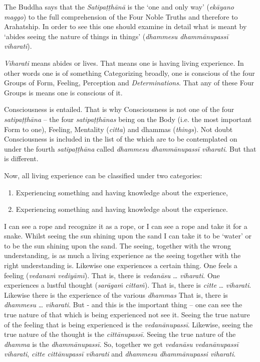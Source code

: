 The Buddha says that the \emph{Satipaṭṭhānā} is the `one and only way' (\emph{ekāyano maggo}) to the full comprehension of the Four Noble Truths and therefore to Arahatship. In order to see this one should examine in detail what is meant by `abides seeing the nature of things in things' (\emph{dhammesu dhammānupassī viharati}).

\emph{Viharati} means abides or lives. That means one is having living experience. In other words one is  of something Categorizing broadly, one is conscious of the four Groups of Form, Feeling, Perception and \emph{Determinations}. That any of these Four Groups is  means one is conscious of it.

Consciousness is  entailed. That is why Consciousness is not one of the four \emph{satipaṭṭhāna} -- the four \emph{satipaṭṭhānas} being on the Body (i.e. the most important Form to one), Feeling, Mentality (\emph{citta}) and dhammas (\emph{things}). Not doubt Consciousness is included in the list of the  which are to be contemplated on under the fourth \emph{satipaṭṭhāna} called \emph{dhammesu dhammānupassī viharati}. But that is different.

Now, all living experience can be classified under two categories:

\begin{enumerate}
\def\labelenumi{\arabic{enumi}.}
\item
  Experiencing something and having  knowledge about the experience,
\item
  Experiencing something and having  knowledge about the experience.
\end{enumerate}

I can see a rope and recognize it as a rope, or I can see a rope and take it for a snake. Whilst seeing the sun shining upon the sand I can take it to be `water' or to be the sun shining upon the sand. The seeing, together with the wrong understanding, is as much a living experience as the seeing together with the right understanding is. Likewise one experiences a certain thing. One feels a feeling (\emph{vedanaṁ vediyāmī}). That is, there is \emph{vedanāsu} \ldots\hspace{0pt} \emph{viharati}. One experiences a lustful thought (\emph{sarāgaṁ cittaṁ}). That is, there is \emph{citte} \ldots\hspace{0pt} \emph{viharati}. Likewise there is the experience of the various \emph{dhammas} That is, there is \emph{dhammesu} \ldots\hspace{0pt} \emph{viharati}. But - and this is the important thing -- one can see the true nature of that which is being experienced  not see it. Seeing the true nature of the feeling that is being experienced is the \emph{vedanānupassī}. Likewise, seeing the true nature of the thought is the \emph{cittānupassī}. Seeing the true nature of the \emph{dhamma} is the \emph{dhammānupassī}. So, together we get \emph{vedanāsu vedanānupassī viharati}, \emph{citte cittānupassī viharati} and \emph{dhammesu dhammānupassi viharati}.

